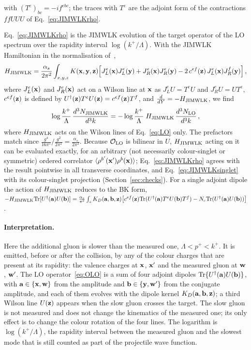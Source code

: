 with $(T^e)_{bc}=-if^{ebc}$; the traces with $T^e$ are the adjoint form of the contractions $ffUUU$ of Eq.~\eqref{eq:JIMWLKrho}.

Eq.~\eqref{eq:JIMWLKrho} is the JIMWLK evolution of the target operator of the LO spectrum over the rapidity interval $\log(k^+/\Lambda)$. With the JIMWLK Hamiltonian in the normalisation of~\cite{Lublinsky:2016meo},
\begin{align}\label{eq:HJIMWLK}
H_{\rm JIMWLK}=\frac{\alpha_s}{2\pi^2}\int_{x,y,z}K(\mathbf{x},\mathbf{y},\mathbf{z})\Big[J_L^e(\mathbf{x})J_L^e(\mathbf{y})+J_R^e(\mathbf{x})J_R^e(\mathbf{y})-2\,c^{ef}(\mathbf{z})\,J_L^e(\mathbf{x})J_R^f(\mathbf{y})\Big]\,,
\end{align}
where $J_L^e(\mathbf{x})$ and $J_R^e(\mathbf{x})$ act on a Wilson line at $\mathbf{x}$ as $J_L^eU=T^eU$ and $J_R^eU=UT^e$, $c^{ef}(\mathbf{z})$ is defined by $U^\dagger(\mathbf{z})T^eU(\mathbf{z})=c^{ef}(\mathbf{z})T^f$, and $\frac{d}{dY}=-H_{\rm JIMWLK}$, we find
\begin{align}\label{eq:JIMWLKasLO}
\log\frac{k^+}{\Lambda}\,\frac{d^3N_{\rm JIMWLK}}{d^3k}=-\log\frac{k^+}{\Lambda}\;H_{\rm JIMWLK}\,\frac{d^3N_{\rm LO}}{d^3k}\,,
\end{align}
where $H_{\rm JIMWLK}$ acts on the Wilson lines of Eq.~\eqref{eq:LO} only. The prefactors match since $\frac{g^4}{16\pi^5}\big/\frac{g^2}{2\pi^2}=\frac{\alpha_s}{2\pi^2}$. Because $\mathcal O_{\rm LO}$ is bilinear in $U$, $H_{\rm JIMWLK}$ acting on it can be evaluated exactly, for an arbitrary (not necessarily colour-singlet or symmetric) ordered correlator $\langle\rho^{b'}(\mathbf{x}')\rho^b(\mathbf{x})\rangle$; Eq.~\eqref{eq:JIMWLKrho} agrees with the result pointwise in all transverse coordinates, and Eq.~\eqref{eq:JIMWLKsinglet} with its colour-singlet projection (Section~\ref{sec:checks}). For a single adjoint dipole the action of $H_{\rm JIMWLK}$ reduces to the BK form, $-H_{\rm JIMWLK}{\rm Tr}[U^\dagger(\mathbf{a})U(\mathbf{b})]=\frac{\alpha_s}{\pi^2}\int_zK_D(\mathbf{a},\mathbf{b},\mathbf{z})\big[c^{ef}(\mathbf{z}){\rm Tr}(U^\dagger(\mathbf{a})T^eU(\mathbf{b})T^f)-N_c{\rm Tr}(U^\dagger(\mathbf{a})U(\mathbf{b}))\big]$.

\paragraph{Interpretation.} Here the additional gluon is slower than the measured one, $\Lambda<p^+<k^+$. It is emitted, before or after the collision, by any of the colour charges that are present at its rapidity: the valence charges at $\mathbf{x}$, $\mathbf{x}'$ and the measured gluon at $\mathbf{w}$, $\mathbf{w}'$. The LO operator~\eqref{eq:OLO} is a sum of four adjoint dipoles ${\rm Tr}\{U^\dagger(\mathbf{a})U(\mathbf{b})\}$, with $\mathbf{a}\in\{\mathbf{x},\mathbf{w}\}$ from the amplitude and $\mathbf{b}\in\{\mathbf{y},\mathbf{w}'\}$ from the conjugate amplitude, and each of them evolves with the dipole kernel $K_D(\mathbf{a},\mathbf{b},\mathbf{z})$; a third Wilson line $U(\mathbf{z})$ appears when the slow gluon crosses the target. The slow gluon is not measured and does not change the kinematics of the measured one; its only effect is to change the colour rotation of the four lines. The logarithm is $\log(k^+/\Lambda)$, the rapidity interval between the measured gluon and the slowest mode that is still counted as part of the projectile wave function.

